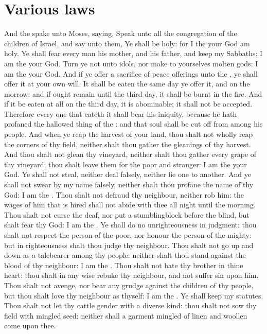 \section*{Various laws}
\begin{biblechapter} %
\verse And the \LORD spake unto Moses, saying,
\verse Speak unto all the congregation of the children of Israel, and say unto them, Ye shall be holy: for I the \LORD your God am holy.
\verse Ye shall fear every man his mother, and his father, and keep my Sabbaths: I am the \LORD your God.
\verse Turn ye not unto idols, nor make to yourselves molten gods: I am the \LORD your God.
\verse And if ye offer a sacrifice of peace offerings unto the \LORD, ye shall offer it at your own will.
\verse It shall be eaten the same day ye offer it, and on the morrow: and if ought remain until the third day, it shall be burnt in the fire.
\verse And if it be eaten at all on the third day, it is abominable; it shall not be accepted.
\verse Therefore every one that eateth it shall bear his iniquity, because he hath profaned the hallowed thing of the \LORD: and that soul shall be cut off from among his people.
\verse And when ye reap the harvest of your land, thou shalt not wholly reap the corners of thy field, neither shalt thou gather the gleanings of thy harvest.
\verse And thou shalt not glean thy vineyard, neither shalt thou gather every grape of thy vineyard; thou shalt leave them for the poor and stranger: I am the \LORD your God.
\verse Ye shall not steal, neither deal falsely, neither lie one to another.
\verse And ye shall not swear by my name falsely, neither shalt thou profane the name of thy God: I am the \LORD.
\verse Thou shalt not defraud thy neighbour, neither rob him: the wages of him that is hired shall not abide with thee all night until the morning.
\verse Thou shalt not curse the deaf, nor put a stumblingblock before the blind, but shalt fear thy God: I am the \LORD.
\verse Ye shall do no unrighteousness in judgment: thou shalt not respect the person of the poor, nor honour the person of the mighty: but in righteousness shalt thou judge thy neighbour.
\verse Thou shalt not go up and down as a talebearer among thy people: neither shalt thou stand against the blood of thy neighbour: I am the \LORD.
\verse Thou shalt not hate thy brother in thine heart: thou shalt in any wise rebuke thy neighbour, and not suffer sin upon him.
\verse Thou shalt not avenge, nor bear any grudge against the children of thy people, but thou shalt love thy neighbour as thyself: I am the \LORD.
\verse Ye shall keep my statutes. Thou shalt not let thy cattle gender with a diverse kind: thou shalt not sow thy field with mingled seed: neither shall a garment mingled of linen and woollen come upon thee.

\end{biblechapter}
